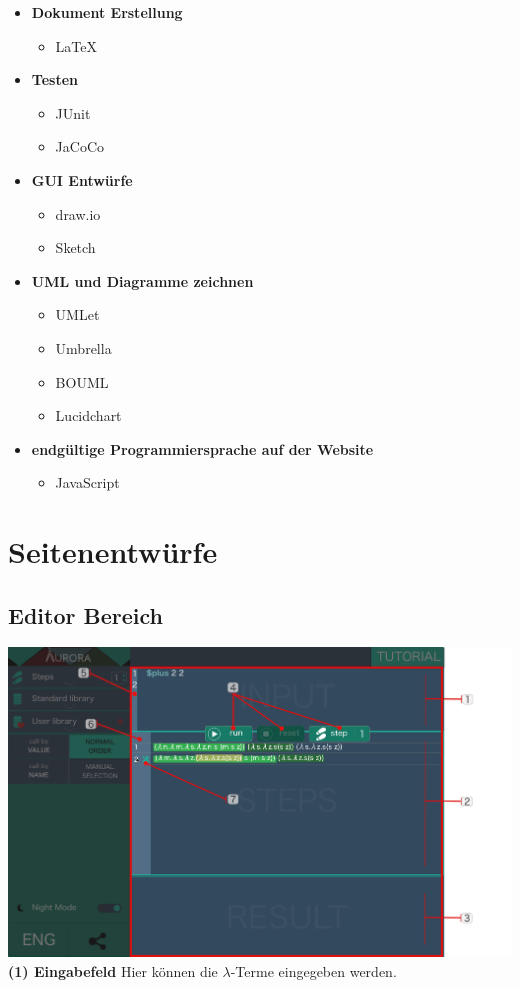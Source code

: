\documentclass[parskip=full,11pt,twoside]{scrartcl}
\begin{document}
\begin{description}
\begin{itemize}
\begin{itemize}
		\end{itemize}
		\item \textbf{Dokument Erstellung}
		\begin{itemize}
			\item LaTeX
		\end{itemize}
		\item \textbf{Testen}
		\begin{itemize}
			\item JUnit
			\item JaCoCo
		\end{itemize}
		\item \textbf{GUI Entwürfe}
			\begin{itemize}
				\item draw.io
				\item Sketch
			\end{itemize}
		\item \textbf{UML und Diagramme zeichnen}
			\begin{itemize}
				\item UMLet
				\item Umbrella
				\item BOUML
				\item Lucidchart
			\end{itemize}
		\item \textbf{endgültige Programmiersprache auf der Website}
			\begin{itemize}
				\item JavaScript
			\end{itemize}
	\end{itemize}
\newpage
\appendix
\end{description}
\section{Seitenentwürfe}
\subsection{Editor Bereich}
\includegraphics[width=\textwidth]{../GUI-Design/tutorials/Tutorial_Editor_Section.png}
\newline
\newline
\textbf{(1) Eingabefeld}
\newline Hier können die $\lambda$-Terme eingegeben werden.
\end{document}
